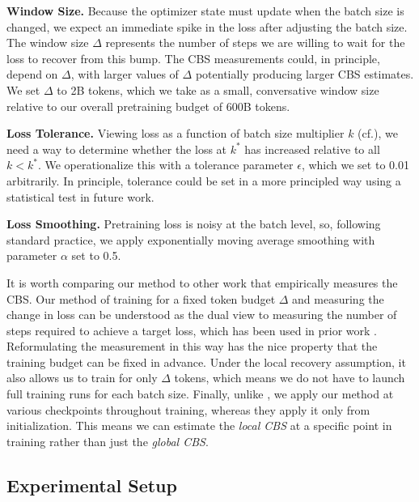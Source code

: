 \documentclass{article}
\begin{document}
\begin{compactenum}
    \item \textbf{Window Size.}
    Because the optimizer state must update when the batch size is changed, we expect an immediate spike in the loss after adjusting the batch size.
    The window size $\Delta$ represents the number of steps we are willing to wait for the loss to recover from this bump.
    The CBS measurements could, in principle, depend on $\Delta$, with larger values of $\Delta$ potentially producing larger CBS estimates.
    We set $\Delta$ to 2B tokens, which we take as a small, conversative window size relative to our overall pretraining budget of 600B tokens.

    \item \textbf{Loss Tolerance.} Viewing loss as a function of batch size multiplier $k$ (cf.), we need a way to determine whether the loss at $k^*$ has increased relative to all $k<k^*$. We operationalize this with a tolerance parameter $\epsilon$, which we set to 0.01 arbitrarily.
    In principle, tolerance could be set in a more principled way using a statistical test in future work.

    \item \textbf{Loss Smoothing.} Pretraining loss is noisy at the batch level, so, following standard practice, we apply exponentially moving average smoothing with parameter $\alpha$ set to 0.5.
\end{compactenum}

It is worth comparing our method to other work that empirically measures the CBS.
Our method of training for a fixed token budget $\Delta$ and measuring the change in loss can be understood as the dual view to measuring the number of steps required to achieve a target loss, which has been used in prior work \citep{zhang-2019-algorithmic,zhang2024cbs}.
Reformulating the measurement in this way has the nice property that the training budget can be fixed in advance.
Under the local recovery assumption, it also allows us to train for only $\Delta$ tokens, which means we do not have to launch full training runs for each batch size.
Finally, unlike \citet{zhang2024cbs}, we apply our method at various checkpoints throughout training, whereas they apply it only from initialization.
This means we can estimate the \emph{local CBS} at a specific point in training rather than just the \emph{global CBS}.

\subsection{Experimental Setup}
\end{document}
